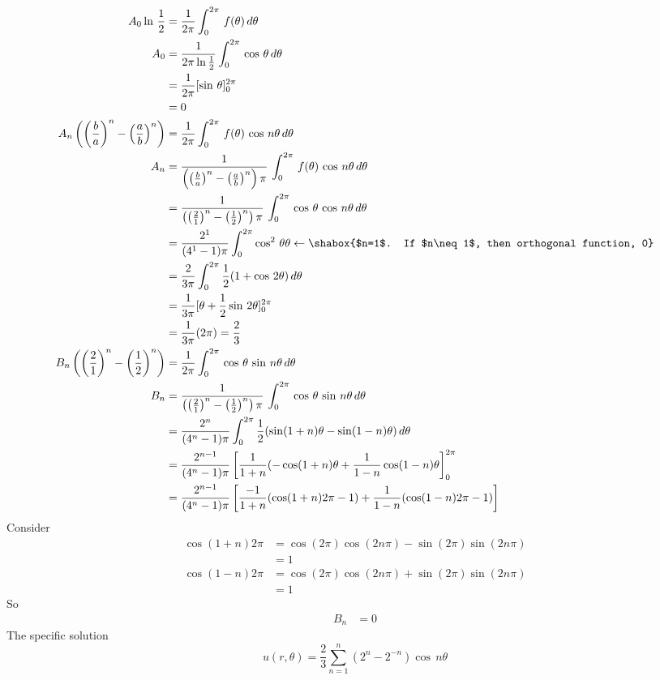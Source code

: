 \begin{align*}
A_0\ln\,\frac{1}{2}&=\frac{1}{2\pi}\int_0^{2\pi}\,f(\theta)\,d\theta\\
A_0&=\frac{1}{2\pi\ln\frac{1}{2}}\int_0^{2\pi}\,\cos\,\theta\,d\theta\\
&=\frac{1}{2\pi}[\sin\,\theta]_0^{2\pi}\\
&=0\\
A_n\left(\left(\frac{b}{a}\right)^n-\left(\frac{a}{b}\right)^n\right)&=\frac{1}{2\pi}\int_0^{2\pi}\,f(\theta)\,\cos\,n\theta\,d\theta\\
A_n&=\frac{1}{\left(\left(\frac{b}{a}\right)^n-\left(\frac{a}{b}\right)^n\right)\pi}\,\int_0^{2\pi}\,f(\theta)\,\cos\,n\theta\,d\theta\\
&=\frac{1}{\left(\left(\frac{2}{1}\right)^n-\left(\frac{1}{2}\right)^n\right)\pi}\,\int_0^{2\pi}\,\cos\,\theta\,\cos\,n\theta\,d\theta\\
&=\frac{2^1}{(4^1-1)\pi}\int_0^{2\pi}\cos^2\,\theta\theta\leftarrow\shabox{$n=1$. If $n\neq 1$, then orthogonal function, 0}\\
&=\frac{2}{3\pi}\int_0^{2\pi}\frac{1}{2}(1+\cos\,2\theta)\,d\theta\\
&=\frac{1}{3\pi}[\theta+\frac{1}{2}\sin\,2\theta]_0^{2\pi}\\
&=\frac{1}{3\pi}(2\pi)=\frac{2}{3}\\
B_n\left(\left(\frac{2}{1}\right)^n-\left(\frac{1}{2}\right)^n\right)&=\frac{1}{2\pi}\int_0^{2\pi}\,\cos\,\theta\,\sin\,n\theta\,d\theta\\
B_n&=\frac{1}{\left(\left(\frac{2}{1}\right)^n-\left(\frac{1}{2}\right)^n\right)\pi}\,\int_0^{2\pi}\,\cos\,\theta\,\sin\,n\theta\,d\theta\\
&=\frac{2^n}{(4^n-1)\pi}\int_0^{2\pi}\frac{1}{2}(\sin(1+n)\theta-\sin(1-n)\theta)\,d\theta\\
&=\frac{2^{n-1}}{(4^n-1)\pi}\left[\frac{1}{1+n}(-\cos(1+n)\theta+\frac{1}{1-n}\cos(1-n)\theta\right]_0^{2\pi}\\
&=\frac{2^{n-1}}{(4^n-1)\pi}\left[\frac{-1}{1+n}(\cos(1+n)2\pi-1)+\frac{1}{1-n}(\cos(1-n)2\pi-1)\right]\\
\end{align*}
Consider
\begin{align*}
\cos(1+n)2\pi&=\cos(2\pi)\cos(2n\pi)-\sin(2\pi)\sin(2n\pi)\\
&=1\\
\cos(1-n)2\pi&=\cos(2\pi)\cos(2n\pi)+\sin(2\pi)\sin(2n\pi)\\
&=1
\end{align*}
So 
\begin{align*}
B_n&=0
\end{align*}
The specific solution
\begin{equation}
u(r,\theta)=\frac{2}{3}\sum_{n=1}^n\left(2^n-2^{-n}\right)\cos\,n\theta
\end{equation}
